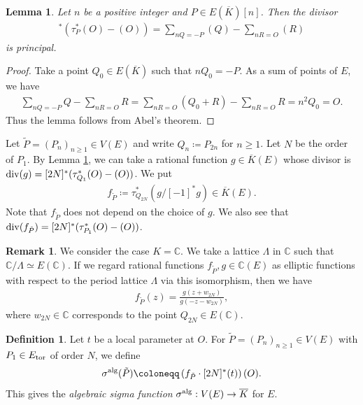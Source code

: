 \documentclass[11pt]{amsart}
\newtheorem{lem}[thm]{Lemma}
\theoremstyle{definition}
\newtheorem{dfn}[thm]{Definition}
\newtheorem{rmk}[thm]{Remark}
\begin{document}
\begin{lem}\label{principal lem}
Let $n$ be a positive integer and $P \in E(\overline{K})[n]$. Then the divisor 
%
\begin{align*}
[n]^{\ast}\left(\tau_P^{\ast} (O)-(O)\right)=\sum_{nQ=-P}(Q)-\sum_{nR=O}(R)
\end{align*}
%
is principal.
\end{lem}

\begin{proof}
Take a point $Q_0 \in E(\overline{K})$ such that $nQ_0=-P$. As a sum of points of $E$, we have
%
\begin{align*}
\sum_{nQ=-P}Q-\sum_{nR=O}R=\sum_{nR=O}(Q_0+R)-\sum_{nR=O}R=n^2Q_0=O.
\end{align*}
%
Thus the lemma follows from Abel's theorem.
\end{proof}

Let $\tilde{P}=(P_n)_{n \geq 1} \in V(E)$ and write $Q_n \coloneqq P_{2n}$ for $n \geq 1$. Let $N$ be the order of $P_1$. By Lemma \ref{principal lem}, we can take a rational function $g \in \overline{K}(E)$ whose divisor is ${\rm div}(g)=[2N]^{\ast}(\tau_{Q_1}^{\ast} (O)-(O))$. We put
%
\begin{align*}
f_{\tilde{P}} \coloneqq \tau_{Q_{2N}}^{\ast}(g/[-1]^{\ast}g) \in \overline{K}(E).
\end{align*}
%
Note that $f_{\tilde{P}}$ does not depend on the choice of $g$. We also see that ${\rm div}(f_{\tilde{P}})=[2N]^{\ast}(\tau_{P_1}^{\ast} (O)-(O))$.

\begin{rmk}\label{f as ell func}
We consider the case $K=\mathbb{C}$. We take a lattice $\Lambda$ in $\mathbb{C}$ such that $\mathbb{C}/\Lambda \simeq E(\mathbb{C})$. If we regard rational functions $f_{\tilde{P}}, g \in \mathbb{C}(E)$ as elliptic functions with respect to the period lattice $\Lambda$ via this isomorphism, then we have
%
\begin{align*}
f_{\tilde{P}}(z)=\frac{g(z+w_{2N})}{g(-z-w_{2N})},
\end{align*}
%
where $w_{2N} \in \mathbb{C}$ corresponds to the point $Q_{2N} \in E(\mathbb{C})$.
\end{rmk}

\begin{dfn}\label{def algsigma}
Let $t$ be a local parameter at $O$. For $\tilde{P}=(P_n)_{n \geq 1} \in V(E)$ with $P_1 \in E_{\rm tor}$ of order $N$, we define 
%
\begin{align*}
\sigma^{\rm alg}(\tilde{P}) \coloneqq \left(f_{\tilde{P}} \cdot [2N]^{\ast}(t)\right)(O).
\end{align*}
%
This gives the {\it algebraic sigma function} $\sigma^{\rm alg} : V(E) \rightarrow \overline{K}$ for $E$.
\end{dfn}
\end{document}
